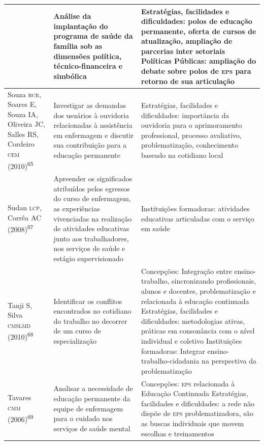 \documentclass{article}
\begin{document}
\begin{table}
\begin{xtabular}{ l | l | l }
& Análise da implantação do programa de saúde da família sob as dimensões
política, técnico-financeira e simbólica
& Estratégias, facilidades e dificuldades: polos de educação permanente, oferta
de cursos de atualização, ampliação de parcerias inter setoriais Políticas
Públicas: ampliação do debate sobre polos de \textsc{eps} para retorno de sua articulação
\\ \hline

Souza \textsc{rcr}, Soares E, Souza IA, Oliveira JC, Salles RS, Cordeiro \textsc{cem} (2010)\textsuperscript{65}

& Investigar as demandas dos usuários à ouvidoria relacionadas à assistência em
enfermagem e discutir sua contribuição para a educação permanente
& Estratégias, facilidades e dificuldades: importância da ouvidoria para o
aprimoramento professional, processo avaliativo, problematização, conhecimento
baseado na cotidiano local
\\ \hline

Sudan \textsc{lcp}, Corrêa AC (2008)\textsuperscript{67}

& Apreender os significados atribuídos pelos egressos do curso de enfermagem, as
experiências vivenciadas na realização de atividades educativas junto aos
trabalhadores, nos serviços de saúde e estágio supervisionado
& Instituições formadoras: atividades educativas articuladas com o serviço em
saúde
\\ \hline

Tanji S, Silva \textsc{cmslmd} (2010)\textsuperscript{68}

& Identificar os conflitos encontrados no cotidiano do trabalho no decorrer de
um curso de especialização
& Concepções: Integração entre ensino-trabalho, sincronizando profissionais,
alunos e docentes, problematização e relacionada à educação continuada
Estratégias, facilidades e dificuldades: metodologias ativas, práticas em
consonância com o nível individual e coletivo Instituições formadoras: Integrar
ensino-trabalho-cidadania na perspectiva da problematização
\\ \hline

Tavares \textsc{cmm} (2006)\textsuperscript{69}

& Analisar a necessidade de educação permanente da equipe de enfermagem para o
cuidado nos serviços de saúde mental
& Concepções: \textsc{eps} relacionada à Educação Continuada Estratégias, facilidades e
dificuldades: a rede não dispõe de \textsc{eps} problematizadora, são as buscas
individuais que movem escolhas e treinamentos
\\ \hline


\end{xtabular}
\end{table}
\end{document}
